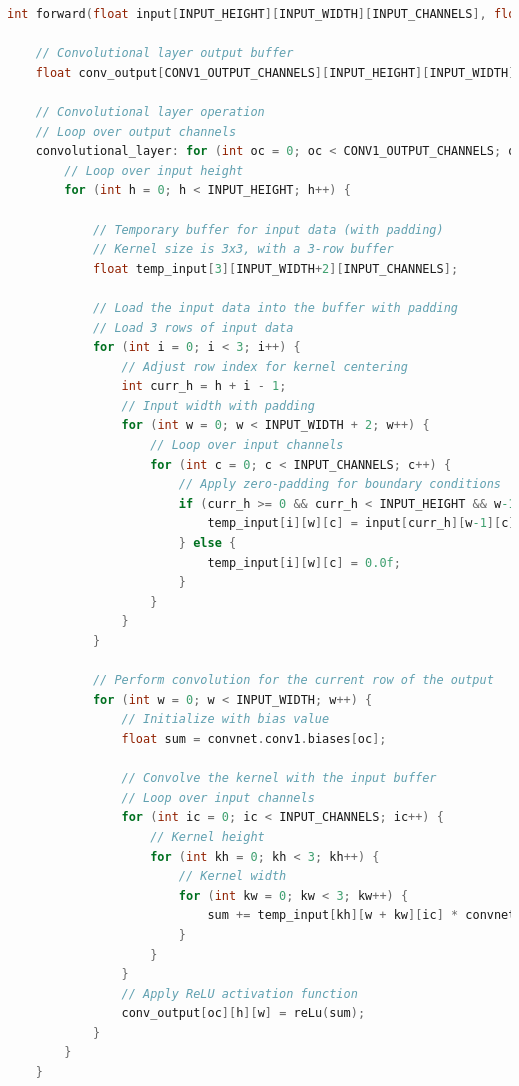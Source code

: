 \documentclass{article}
\begin{document}
\begin{lstlisting}[language=C]
int forward(float input[INPUT_HEIGHT][INPUT_WIDTH][INPUT_CHANNELS], float output[NUM_CLASSES]) {
    
    // Convolutional layer output buffer
    float conv_output[CONV1_OUTPUT_CHANNELS][INPUT_HEIGHT][INPUT_WIDTH];
    
    // Convolutional layer operation
    // Loop over output channels
    convolutional_layer: for (int oc = 0; oc < CONV1_OUTPUT_CHANNELS; oc++) {
        // Loop over input height
        for (int h = 0; h < INPUT_HEIGHT; h++) {        

            // Temporary buffer for input data (with padding)
            // Kernel size is 3x3, with a 3-row buffer
            float temp_input[3][INPUT_WIDTH+2][INPUT_CHANNELS]; 
            
            // Load the input data into the buffer with padding
            // Load 3 rows of input data
            for (int i = 0; i < 3; i++) { 
                // Adjust row index for kernel centering
                int curr_h = h + i - 1;  
                // Input width with padding
                for (int w = 0; w < INPUT_WIDTH + 2; w++) { 
                    // Loop over input channels
                    for (int c = 0; c < INPUT_CHANNELS; c++) {
                        // Apply zero-padding for boundary conditions
                        if (curr_h >= 0 && curr_h < INPUT_HEIGHT && w-1 >= 0 && w-1 < INPUT_WIDTH) {
                            temp_input[i][w][c] = input[curr_h][w-1][c];
                        } else {
                            temp_input[i][w][c] = 0.0f;
                        }
                    }
                }
            }
            
            // Perform convolution for the current row of the output
            for (int w = 0; w < INPUT_WIDTH; w++) {
                // Initialize with bias value
                float sum = convnet.conv1.biases[oc]; 
                
                // Convolve the kernel with the input buffer
                // Loop over input channels
                for (int ic = 0; ic < INPUT_CHANNELS; ic++) { 
                    // Kernel height
                    for (int kh = 0; kh < 3; kh++) {      
                        // Kernel width    
                        for (int kw = 0; kw < 3; kw++) {      
                            sum += temp_input[kh][w + kw][ic] * convnet.conv1.weights[oc][ic][kh][kw];
                        }
                    }
                }
                // Apply ReLU activation function
                conv_output[oc][h][w] = reLu(sum); 
            }
        }
    }


\end{lstlisting}
\end{document}
